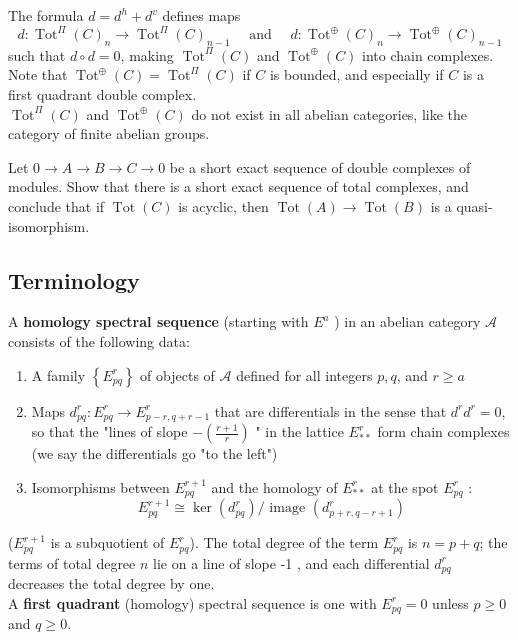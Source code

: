 The formula $d=d^h+d^v$ defines maps
$$
d: \operatorname{Tot}^{\Pi}(C)_n \rightarrow \operatorname{Tot}^{\Pi}(C)_{n-1} \quad \text { and } \quad d: \operatorname{Tot}^{\oplus}(C)_n \rightarrow \operatorname{Tot}^{\oplus}(C)_{n-1}
$$
such that $d \circ d=0$, making $\operatorname{Tot}^{\Pi}(C)$ and $\operatorname{Tot}^{\oplus}(C)$ into chain complexes. Note that $\operatorname{Tot}^{\oplus}(C)=\operatorname{Tot}^{\Pi}(C)$ if $C$ is bounded, and especially if $C$ is a first quadrant double complex.\\ $\operatorname{Tot}^{\Pi}(C)$ and $\operatorname{Tot}^{\oplus}(C)$ do not exist in all abelian categories, like the category of finite abelian groups.

\begin{prop}
Let $0 \rightarrow A \rightarrow B \rightarrow C \rightarrow 0$ be a short exact sequence of double complexes of modules. Show that there is a short exact sequence of total complexes, and conclude that if $\operatorname{Tot}(C)$ is acyclic, then $\operatorname{Tot}(A) \rightarrow \operatorname{Tot}(B)$ is a quasi-isomorphism.
\end{prop}

\subsection{Terminology}

A \textbf{homology spectral sequence } (starting with $E^a$ ) in an abelian category $\mathcal{A}$ consists of the following data:
\begin{enumerate}
    \item 
    A family $\left\{E_{p q}^r\right\}$ of objects of $\mathcal{A}$ defined for all integers $p, q$, and $r \geq a$
    \item 
    Maps $d_{p q}^r: E_{p q}^r \rightarrow E_{p-r, q+r-1}^r$ that are differentials in the sense that $d^r d^r=0$, so that the "lines of slope $ \displaystyle - \left(\frac{r+1}{r}\right)$ " in the lattice $E_{* *}^r$ form chain complexes (we say the differentials go "to the left")
    \item 
    Isomorphisms between $E_{p q}^{r+1}$ and the homology of $E_{* *}^r$ at the spot $E_{p q}^r$ :
    $$
    E_{p q}^{r+1} \cong \operatorname{ker}\left(d_{p q}^r\right) / \text { image }\left(d_{p+r, q-r+1}^r\right)
    $$
\end{enumerate}

($E_{p q}^{r+1}$ is a subquotient of $E_{p q}^r$). The total degree of the term $E_{p q}^r$ is $n=p+q$; the terms of total degree $n$ lie on a line of slope -1 , and each differential $d_{p q}^r$ decreases the total degree by one.\\
A \textbf{first quadrant} (homology) spectral sequence is one with $E_{p q}^r=0$ unless $p \geq 0$ and $q \geq 0$.\\

